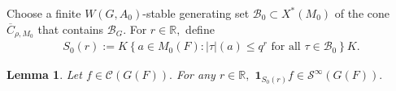 \documentclass[10pt]{amsart}
\newtheorem{corollary}{Corollary}[theorem]
\newtheorem{lemma}[theorem]{Lemma}
\theoremstyle{definition}
\numberwithin{equation}{section}
\DeclareMathOperator{\vol}{\mathrm{vol}}
\numberwithin{equation}{subsection}
\newcommand{\Ind}{\mathrm{Ind}}
\newcommand{\RR}{\mathbb{R}}
\newcommand{\calB}{\mathcal{B}}
\begin{document}

Choose a finite $W(G,A_0)$-stable generating set $\calB_0\subset X^\ast(M_0)$ of the cone $\overline{C}_{\rho,M_0}$ that contains $\calB_G.$ For $r\in \RR,$ define
\begin{align*}
    S_0(r):=K\left\{ a\in M_0(F): |\tau|(a)\le q^r \textrm{ for all } \tau\in \calB_0\right\}K.
\end{align*}

\begin{lemma}\label{supporttrunc}
    Let $f\in \mathcal{C}(G(F)).$ For any $r\in \RR,$ $\mathbf{1}_{S_0(r)}f\in \mathcal{S}^\infty(G(F)).$ 
\end{lemma}
\end{document}
